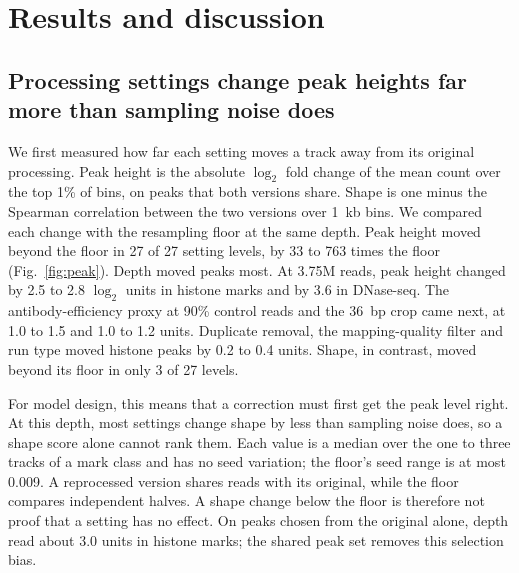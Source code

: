 \documentclass[pdflatex,sn-mathphys-num]{sn-jnl}
\newcommand{\lit}[1]{#1}
\newcommand{\nPh}{27}
\newcommand{\nPhAbove}{27}
\newcommand{\nSh}{27}
\newcommand{\nShAbove}{3}
\newcommand{\peakAbHistHi}{1.5}
\newcommand{\peakAbHistLo}{1.0}
\newcommand{\peakCropHistHi}{1.2}
\newcommand{\peakCropHistLo}{1.0}
\newcommand{\peakDepthDn}{3.6}
\newcommand{\peakDepthFirstHi}{3.0}
\newcommand{\peakDepthHistHi}{2.8}
\newcommand{\peakDepthHistLo}{2.5}
\newcommand{\peakRestHi}{0.4}
\newcommand{\peakRestLo}{0.2}
\newcommand{\phFloorSpreadHi}{0.009}
\newcommand{\phRatioHi}{763}
\newcommand{\phRatioLo}{33}
\begin{document}
\section{Results and discussion}\label{sec:results}

\subsection{Processing settings change peak heights far more than sampling noise does}\label{sec:r1}

We first measured how far each setting moves a track away from its original processing. Peak
height is the absolute $\log_{\lit{2}}$ fold change of the mean count over the top
\lit{1}\% of bins, on peaks that both versions share. Shape is one minus the Spearman
correlation between the two versions over \lit{1}~kb bins. We compared each change with the
resampling floor at the same depth. Peak height moved beyond the floor in \nPhAbove{} of
\nPh{} setting levels, by \phRatioLo{} to \phRatioHi{} times the floor (Fig.~\ref{fig:peak}).
Depth moved peaks most. At \lit{3.75}M reads, peak height changed by \peakDepthHistLo{} to
\peakDepthHistHi{} $\log_{\lit{2}}$ units in histone marks and by \peakDepthDn{} in DNase-seq.
The antibody-efficiency proxy at \lit{90}\% control reads and the \lit{36}~bp crop came next,
at \peakAbHistLo{} to \peakAbHistHi{} and \peakCropHistLo{} to \peakCropHistHi{} units.
Duplicate removal, the mapping-quality filter and run type moved histone peaks by
\peakRestLo{} to \peakRestHi{} units. Shape, in contrast, moved beyond its floor in only
\nShAbove{} of \nSh{} levels.

For model design, this means that a correction must first get the peak level right. At this
depth, most settings change shape by less than sampling noise does, so a shape score alone
cannot rank them. Each value is a median over the one to three tracks of a mark class and has
no seed variation; the floor's seed range is at most \phFloorSpreadHi{}. A reprocessed version
shares reads with its original, while the floor compares independent halves. A shape change
below the floor is therefore not proof that a setting has no effect. On peaks chosen from the
original alone, depth read about \peakDepthFirstHi{} units in histone marks; the shared peak
set removes this selection bias.
\end{document}
